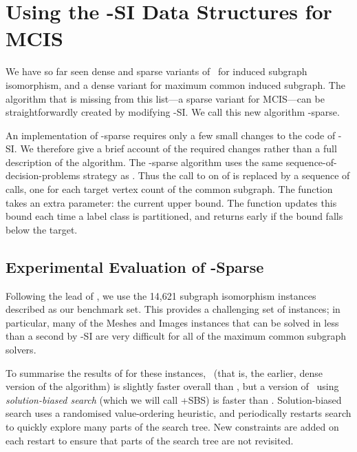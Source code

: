 \FloatBarrier

\section{Using the \McSplit-SI Data Structures for MCIS}\label{sec:mcsplit-sparse}

We have so far seen dense and sparse variants of \McSplit\ for induced subgraph isomorphism, and
a dense variant for maximum common induced subgraph.  The algorithm that is missing from this
list---a sparse variant for MCIS---can be straightforwardly created by modifying \McSplit-SI. 
We call this new algorithm \McSplit-sparse.

An implementation of \McSplit-sparse
requires only a few small changes to the code of \McSplit-SI. We
therefore give a brief account of the required changes rather than a full
description of the algorithm.  The \McSplit-sparse algorithm uses the same
sequence-of-decision-problems strategy as \McSplitDown. Thus the call to
 on  of 
is replaced by a sequence of calls, one for each target
vertex count of the common
subgraph.  The  function takes an extra parameter: the current
upper bound. The  function updates this bound each time a label
class is partitioned, and returns early if the bound falls below the target.

\subsection{Experimental Evaluation of \McSplit-Sparse}

Following the lead of \cite{DBLP:conf/cpaior/ArchibaldDHMP019},
we use the 14,621 subgraph isomorphism instances described
 as our benchmark set.
This provides a challenging set of instances; in particular,
many of the Meshes and Images instances that can be solved in less
than a second by \McSplit-SI are very difficult for all of the maximum
common subgraph solvers.

To summarise the results of \cite{DBLP:conf/cpaior/ArchibaldDHMP019}
for these instances, \McSplitDown\ (that is, the earlier, dense version
of the algorithm) is slightly faster overall than
\kDown, but a version of \kDown\ using \emph{solution-biased
search} (which we will call \kDown+SBS) is faster than
\McSplitDown.  Solution-biased search uses a randomised value-ordering
heuristic, and periodically restarts search to quickly
explore many parts of the search tree.  New constraints are added
on each restart to ensure that parts of the search tree are not
revisited.

